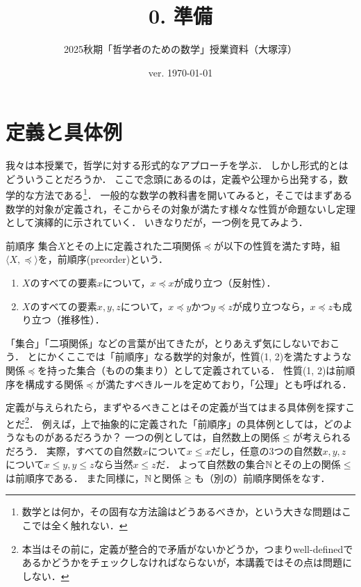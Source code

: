 \documentclass[11pt,a4paper]{jsarticle}
\begin{document}
\title{0. 準備}
\author{2025秋期「哲学者のための数学」授業資料（大塚淳）}
\date{ver. \today}
\maketitle



\section{定義と具体例}
我々は本授業で，哲学に対する形式的なアプローチを学ぶ．
しかし形式的とはどういうことだろうか．
ここで念頭にあるのは，定義や公理から出発する，数学的な方法である\footnote{数学とは何か，その固有な方法論はどうあるべきか，という大きな問題はここでは全く触れない．}．
一般的な数学の教科書を開いてみると，そこではまずある数学的対象が定義され，そこからその対象が満たす様々な性質が命題ないし定理として演繹的に示されていく．
いきなりだが，一つ例を見てみよう．

\begin{dfn}{前順序}{}
 集合$X$とその上に定義された二項関係$\preceq$が以下の性質を満たす時，組$\langle X, \preceq \rangle$を，前順序(preorder)という．
\begin{enumerate}
 \item $X$のすべての要素$x$について，$x \preceq x$が成り立つ（反射性）．
 \item $X$のすべての要素$x, y, z$について，$x \preceq y$かつ$y \preceq z$が成り立つなら，$x \preceq z$も成り立つ（推移性）．
\end{enumerate}
\end{dfn}

「集合」「二項関係」などの言葉が出てきたが，とりあえず気にしないでおこう．
とにかくここでは「前順序」なる数学的対象が，性質(1, 2)を満たすような関係$\preceq$を持った集合（ものの集まり）として定義されている．
性質(1, 2)は前順序を構成する関係$\preceq$が満たすべきルールを定めており，「公理」とも呼ばれる．

定義が与えられたら，まずやるべきことはその定義が当てはまる具体例を探すことだ\footnote{本当はその前に，定義が整合的で矛盾がないかどうか，つまりwell-definedであるかどうかをチェックしなければならないが，本講義ではその点は問題にしない．}．
例えば，上で抽象的に定義された「前順序」の具体例としては，どのようなものがあるだろうか？
一つの例としては，自然数上の関係$\leq$が考えられるだろう．
実際，すべての自然数$x$について$x \leq x$だし，任意の3つの自然数$x, y, z$について$x \leq y, y \leq z$なら当然$x \leq z$だ．
よって自然数の集合$\mathbb{N}$とその上の関係$\leq$は前順序である．
また同様に，$\mathbb{N}$と関係$\geq$も（別の）前順序関係をなす．
\end{document}
